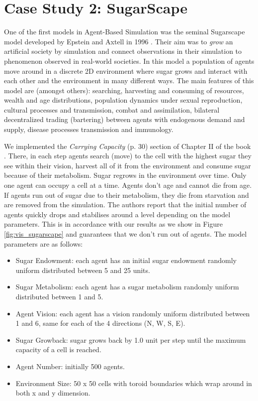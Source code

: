 \section{Case Study 2: SugarScape} %
\label{sec:cs_sugarscape}

One of the first models in Agent-Based Simulation was the seminal Sugarscape model developed by Epstein and Axtell in 1996 \cite{epstein_growing_1996}. Their aim was to \textit{grow} an artificial society by simulation and connect observations in their simulation to phenomenon observed in real-world societies. In this model a population of agents move around in a discrete 2D environment where sugar grows and interact with each other and the environment in many different ways. The main features of this model are (amongst others): searching, harvesting and consuming of resources, wealth and age distributions, population dynamics under sexual reproduction, cultural processes and transmission, combat and assimilation, bilateral decentralized trading (bartering) between agents with endogenous demand and supply, disease processes transmission and immunology.

We implemented the \textit{Carrying Capacity} (p. 30) section of Chapter II of the book \cite{epstein_growing_1996}. There, in each step agents search (move) to the cell with the highest sugar they see within their vision, harvest all of it from the environment and consume sugar because of their metabolism. Sugar regrows in the environment over time. Only one agent can occupy a cell at a time. Agents don't age and cannot die from age. If agents run out of sugar due to their metabolism, they die from starvation and are removed from the simulation. The authors report that the initial number of agents quickly drops and stabilises around a level depending on the model parameters. This is in accordance with our results as we show in Figure \ref{fig:vis_sugarscape} and guarantees that we don't run out of agents. The model parameters are as follows:

\begin{itemize}
	\item Sugar Endowment: each agent has an initial sugar endowment randomly uniform distributed between 5 and 25 units.
	\item Sugar Metabolism: each agent has a sugar metabolism randomly uniform distributed between 1 and 5.
	\item Agent Vision: each agent has a vision randomly uniform distributed between 1 and 6, same for each of the 4 directions (N, W, S, E). 
	\item Sugar Growback: sugar grows back by 1.0 unit per step until the maximum capacity of a cell is reached.
	\item Agent Number: initially 500 agents.
	\item Environment Size: 50 x 50 cells with toroid boundaries which wrap around in both x and y dimension.
\end{itemize}

